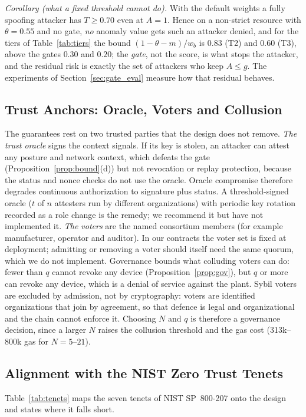 \emph{Corollary (what a fixed threshold cannot do).} With the default weights a fully spoofing attacker has $T\ge0.70$ even at $A=1$. Hence on a non-strict resource with $\theta=0.55$ and no gate, \emph{no} anomaly value gets such an attacker denied, and for the tiers of Table~\ref{tab:tiers} the bound $(1-\theta-m)/w_b$ is $0.83$ (T2) and $0.60$ (T3), above the gates $0.30$ and $0.20$; the \emph{gate}, not the score, is what stops the attacker, and the residual risk is exactly the set of attackers who keep $A\le g$. The experiments of Section~\ref{sec:gate_eval} measure how that residual behaves.

\subsection{Trust Anchors: Oracle, Voters and Collusion}\label{sec:anchors}
The guarantees rest on two trusted parties that the design does not remove. \emph{The trust oracle} signs the context signals. If its key is stolen, an attacker can attest any posture and network context, which defeats the gate (Proposition~\ref{prop:bound}(d)) but not revocation or replay protection, because the status and nonce checks do not use the oracle. Oracle compromise therefore degrades continuous authorization to signature plus status. A threshold-signed oracle ($t$ of $n$ attesters run by different organizations) with periodic key rotation recorded as a role change is the remedy; we recommend it but have not implemented it. \emph{The voters} are the named consortium members (for example manufacturer, operator and auditor). In our contracts the voter set is fixed at deployment; admitting or removing a voter should itself need the same quorum, which we do not implement. Governance bounds what colluding voters can do: fewer than $q$ cannot revoke any device (Proposition~\ref{prop:gov}), but $q$ or more can revoke any device, which is a denial of service against the plant. Sybil voters are excluded by admission, not by cryptography: voters are identified organizations that join by agreement, so that defence is legal and organizational and the chain cannot enforce it. Choosing $N$ and $q$ is therefore a governance decision, since a larger $N$ raises the collusion threshold and the gas cost (313k--800k gas for $N=5$--$21$).

\subsection{Alignment with the NIST Zero Trust Tenets}\label{sec:tenets}
Table~\ref{tab:tenets} maps the seven tenets of NIST SP~800-207 \cite{nist800207} onto the design and states where it falls short.

